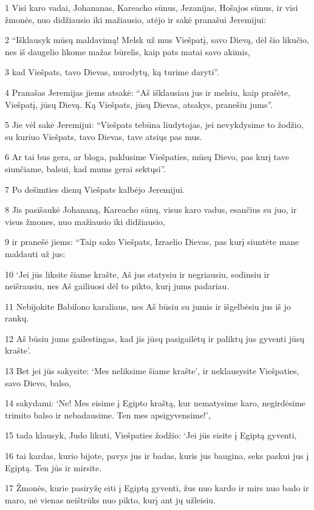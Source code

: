 \par 1 Visi karo vadai, Johananas, Kareacho sūnus, Jezanijas, Hošajos sūnus, ir visi žmonės, nuo didžiausio iki mažiausio, atėjo ir sakė pranašui Jeremijui: 
\par 2 “Išklausyk mūsų maldavimą! Melsk už mus Viešpatį, savo Dievą, dėl šio likučio, nes iš daugelio likome mažas būrelis, kaip pats matai savo akimis, 
\par 3 kad Viešpats, tavo Dievas, nurodytų, ką turime daryti”. 
\par 4 Pranašas Jeremijas jiems atsakė: “Aš išklausiau jus ir melsiu, kaip prašėte, Viešpatį, jūsų Dievą. Ką Viešpats, jūsų Dievas, atsakys, pranešiu jums”. 
\par 5 Jie vėl sakė Jeremijui: “Viešpats tebūna liudytojas, jei nevykdysime to žodžio, su kuriuo Viešpats, tavo Dievas, tave atsiųs pas mus. 
\par 6 Ar tai bus gera, ar bloga, paklusime Viešpaties, mūsų Dievo, pas kurį tave siunčiame, balsui, kad mums gerai sektųsi”. 
\par 7 Po dešimties dienų Viešpats kalbėjo Jeremijui. 
\par 8 Jis pasišaukė Johananą, Kareacho sūnų, visus karo vadus, esančius su juo, ir visus žmones, nuo mažiausio iki didžiausio, 
\par 9 ir pranešė jiems: “Taip sako Viešpats, Izraelio Dievas, pas kurį siuntėte mane maldauti už jus: 
\par 10 ‘Jei jūs liksite šiame krašte, Aš jus statysiu ir negriausiu, sodinsiu ir neišrausiu, nes Aš gailiuosi dėl to pikto, kurį jums padariau. 
\par 11 Nebijokite Babilono karaliaus, nes Aš būsiu su jumis ir išgelbėsiu jus iš jo rankų. 
\par 12 Aš būsiu jums gailestingas, kad jis jūsų pasigailėtų ir paliktų jus gyventi jūsų krašte’. 
\par 13 Bet jei jūs sakysite: ‘Mes neliksime šiame krašte’, ir neklausysite Viešpaties, savo Dievo, balso, 
\par 14 sakydami: ‘Ne! Mes eisime į Egipto kraštą, kur nematysime karo, negirdėsime trimito balso ir nebadausime. Ten mes apsigyvensime!’, 
\par 15 tada klausyk, Judo likuti, Viešpaties žodžio: ‘Jei jūs eisite į Egiptą gyventi, 
\par 16 tai kardas, kurio bijote, pavys jus ir badas, kuris jus baugina, seks paskui jus į Egiptą. Ten jūs ir mirsite. 
\par 17 Žmonės, kurie pasiryžę eiti į Egiptą gyventi, žus nuo kardo ir mirs nuo bado ir maro, nė vienas neištrūks nuo pikto, kurį ant jų užleisiu. 
